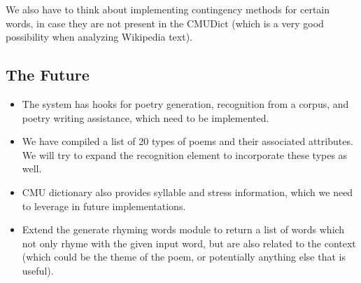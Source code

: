 \documentclass[10pt, letter]{article}
\begin{document}
We also have to think about implementing contingency methods for certain words, in case they are not present in the CMUDict (which is a very good possibility when analyzing Wikipedia text).

\subsection*{The Future}
\begin{itemize}
    \item The system has hooks for poetry generation, recognition from a corpus, and poetry writing assistance, which need to be implemented.
    \item We have compiled a list of 20 types of poems and their associated attributes. We will try to expand the recognition element to incorporate these types as well.
    \item CMU dictionary also provides syllable and stress information, which we need to leverage in future implementations.
    \item Extend the generate rhyming words module to return a list of words which not only rhyme with the given input word, but are also related to the context (which could be the theme of the poem, or potentially anything else that is useful).
\end{itemize}



\end{document}
